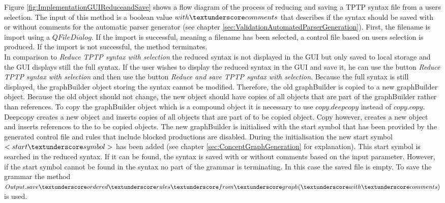 Figure \ref{fig:ImplementationGUIReduceandSave} shows a flow diagram of the process of reducing and saving a \ac{TPTP} syntax file from a users selection.
The input of this method is a boolean value $with\textunderscore comments$ that describes if the syntax should be saved with or without comments for the automatic parser generator (see chapter \ref{sec:ValidationAutomatedParserGeneration}). 
First, the filename is import using a $QFileDialog$.
If the import is successful, meaning a filename has been selected, a control file based on users selection is produced. If the import is not successful, the method terminates. \\
In comparison to \textit{Reduce \ac{TPTP} syntax with selection} the reduced syntax is not displayed in the GUI but only saved to local storage and the GUI displays still the full syntax. If the user wishes to display the reduced syntax in the GUI and save it, he can use the button \textit{Reduce \ac{TPTP} syntax with selection} and then use the button \textit{Reduce and save \ac{TPTP} syntax with selection}.
Because the full syntax is still displayed, the graphBuilder object storing the syntax cannot be modified. Therefore, the old graphBuilder is copied to a new graphBuilder object. Because the old object should not change, the new object should have copies of all objects that are part of the graphBuilder rather than references.
To copy the graphBuilder object which is a compound object it is necessary to use $copy.deepcopy$ instead of $copy.copy$. Deepcopy creates a new object and inserts copies of all objects that are part of to be copied object. Copy however, creates a new object and inserts references to the to be copied objects. 
The new graphBuilder is initialised with the start symbol that has been provided by the generated control file and rules that include blocked productions are disabled. During the initialisation the new start symbol $<start\textunderscore symbol>$ has been added (see chapter \ref{sec:ConceptGraphGeneration} for explanation). This start symbol is searched in the reduced syntax. If it can be found, the syntax is saved with or without comments based on the input parameter. However, if the start symbol cannot be found in the syntax no part of the grammar is terminating. In this case the saved file is empty. To save the grammar the method $Output.save\textunderscore ordered\textunderscore rules\textunderscore from\textunderscore graph(\textunderscore with\textunderscore comments)$ is used.

